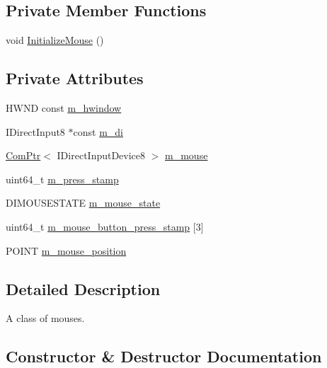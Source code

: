 \subsection*{Private Member Functions}
\begin{DoxyCompactItemize}
\item 
void \hyperlink{classmage_1_1_mouse_ac158b6d6fff5b05dea5ebefa86c0d56a}{Initialize\+Mouse} ()
\end{DoxyCompactItemize}
\subsection*{Private Attributes}
\begin{DoxyCompactItemize}
\item 
H\+W\+ND const \hyperlink{classmage_1_1_mouse_a6389e45df78cc792f11aa5395507deab}{m\+\_\+hwindow}
\item 
I\+Direct\+Input8 $\ast$const \hyperlink{classmage_1_1_mouse_a892a9e1d5ad16ac9b67a5f69fbfedeab}{m\+\_\+di}
\item 
\hyperlink{namespacemage_ae74f374780900893caa5555d1031fd79}{Com\+Ptr}$<$ I\+Direct\+Input\+Device8 $>$ \hyperlink{classmage_1_1_mouse_a3f2803f3c0e008f5d764a11de3dbe098}{m\+\_\+mouse}
\item 
uint64\+\_\+t \hyperlink{classmage_1_1_mouse_a32b30d3c37a2082869f4ff4f522dfbf8}{m\+\_\+press\+\_\+stamp}
\item 
D\+I\+M\+O\+U\+S\+E\+S\+T\+A\+TE \hyperlink{classmage_1_1_mouse_af99645fb4226077abee4532a5e663066}{m\+\_\+mouse\+\_\+state}
\item 
uint64\+\_\+t \hyperlink{classmage_1_1_mouse_a0f5a38e23bdf7eae1b7b1030a53edff0}{m\+\_\+mouse\+\_\+button\+\_\+press\+\_\+stamp} \mbox{[}3\mbox{]}
\item 
P\+O\+I\+NT \hyperlink{classmage_1_1_mouse_a2a8332ef7a4daa0f9ed48a9a1ad80684}{m\+\_\+mouse\+\_\+position}
\end{DoxyCompactItemize}


\subsection{Detailed Description}
A class of mouses. 

\subsection{Constructor \& Destructor Documentation}
\hypertarget{classmage_1_1_mouse_ad02365977dab44603400ac6f24e0df97}{}\label{classmage_1_1_mouse_ad02365977dab44603400ac6f24e0df97} 

